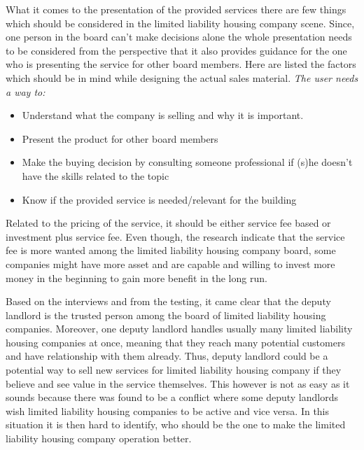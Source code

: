 What it comes to the presentation of the provided services there are few things which should be considered in the limited liability housing company scene. Since, one person in the board can't make decisions alone the whole presentation needs to be considered from the perspective that it also provides guidance for the one who is presenting the service for other board members. Here are listed the factors which should be in mind while designing the actual sales material. \emph{The user needs a way to:}
\begin{itemize}
\item Understand what the company is selling and why it is important.
\item Present the product for other board members
\item Make the buying decision by consulting someone professional if (s)he doesn't have the skills related to the topic
\item Know if the provided service is needed/relevant for the building
\end{itemize}

Related to the pricing of the service, it should be either service fee based or investment plus service fee. Even though, the research indicate that the service fee is more wanted among the limited liability housing company board, some companies might have more asset and are capable and willing to invest more money in the beginning to gain more benefit in the long run.

Based on the interviews and from the testing, it came clear that the deputy landlord is the trusted person among the board of limited liability housing companies. Moreover, one deputy landlord handles usually many limited liability housing companies at once, meaning that they reach many potential customers and have relationship with them already. Thus, deputy landlord could be a potential way to sell new services for limited liability housing company if they believe and see value in the service themselves. This however is not as easy as it sounds because there was found to be a conflict where some deputy landlords wish limited liability housing companies to be active and vice versa. In this situation it is then hard to identify, who should be the one to make the limited liability housing company operation better.

